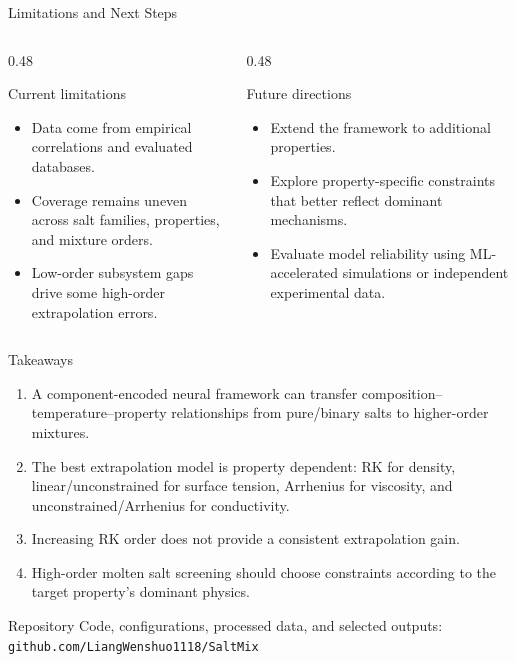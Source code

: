 \documentclass[aspectratio=169,10pt]{beamer}
\begin{document}
\begin{frame}{Limitations and Next Steps}
  \begin{columns}[T,onlytextwidth]
    \begin{column}{0.48\textwidth}
      \begin{block}{Current limitations}
        \begin{itemize}
          \item Data come from empirical correlations and evaluated databases.
          \item Coverage remains uneven across salt families, properties, and mixture orders.
          \item Low-order subsystem gaps drive some high-order extrapolation errors.
        \end{itemize}
      \end{block}
    \end{column}
    \begin{column}{0.48\textwidth}
      \begin{block}{Future directions}
        \begin{itemize}
          \item Extend the framework to additional properties.
          \item Explore property-specific constraints that better reflect dominant mechanisms.
          \item Evaluate model reliability using ML-accelerated simulations or independent experimental data.
        \end{itemize}
      \end{block}
    \end{column}
  \end{columns}
\end{frame}

\begin{frame}{Takeaways}
  \begin{enumerate}
    \item A component-encoded neural framework can transfer composition--temperature--property relationships from pure/binary salts to higher-order mixtures.
    \item The best extrapolation model is property dependent: RK for density, linear/unconstrained for surface tension, Arrhenius for viscosity, and unconstrained/Arrhenius for conductivity.
    \item Increasing RK order does not provide a consistent extrapolation gain.
    \item High-order molten salt screening should choose constraints according to the target property's dominant physics.
  \end{enumerate}

  \vfill
  \begin{block}{Repository}
    Code, configurations, processed data, and selected outputs: \texttt{github.com/LiangWenshuo1118/SaltMix}
  \end{block}
\end{frame}
\end{document}
